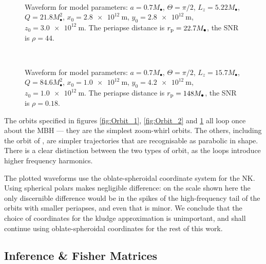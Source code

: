 \begin{figure}[htbp]
  \begin{center}
    \quad
    \\
    \caption{Waveform for model parameters: $a = 0.7 M_\bullet$, $\Theta = \pi/2$, $L_z = 5.22 M_\bullet$, $Q = 21.8 M_\bullet^2$, $x_0 = \SI{2.8e12}{\metre}$, $y_0 = \SI{2.8e12}{\metre}$, $z_0 = \SI{3.0e12}{\metre}$. The periapse distance is $r_\mathrm{p} = 22.7 M_\bullet$, the SNR is $\rho = 44$.}
    \label{fig:Orbit_6}
  \end{center}
\end{figure}
\begin{figure}[htbp]
  \begin{center}
    \quad
    \\
    \caption{Waveform for model parameters: $a = 0.7 M_\bullet$, $\Theta = \pi/2$, $L_z = 15.7 M_\bullet$, $Q = 84.6 M_\bullet^2$, $x_0 = \SI{1.0e12}{\metre}$, $y_0 = \SI{4.2e12}{\metre}$, $z_0 = \SI{1.0e12}{\metre}$. The periapse distance is $r_\mathrm{p} = 148 M_\bullet$, the SNR is $\rho = 0.18$.}
    \label{fig:Orbit_7}
  \end{center}
\end{figure}
The orbits specified in figures \ref{fig:Orbit_1}, \ref{fig:Orbit_2} and \ref{fig:Orbit_6} all loop once about the MBH --- they are the simplest zoom-whirl orbits. The others, including the orbit of , are simpler trajectories that are recognisable as parabolic in shape. There is a clear distinction between the two types of orbit, as the loops introduce higher frequency harmonics.

The plotted waveforms use the oblate-spheroidal coordinate system for the NK. Using spherical polars makes negligible difference: on the scale shown here the only discernible difference would be in the spikes of the high-frequency tail of the orbits with smaller periapses, and even that is minor. We conclude that the choice of coordinates for the kludge approximation is unimportant, and shall continue using oblate-spheroidal coordinates for the rest of this work.

\subsection{Inference \& Fisher Matrices}

